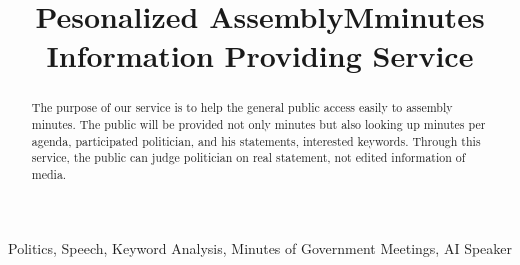 \documentclass[conference]{IEEEtran}
\begin{document}
\title{Pesonalized AssemblyMminutes Information Providing Service \\
}
\author{
\and
{}
\and
{}
\and
{}
}
\maketitle

\begin{abstract}
The purpose of our service is to help the general public access easily to assembly minutes. The public will be provided not only minutes but also looking up minutes per agenda, participated politician, and his statements, interested keywords. Through this service, the public can judge politician on real statement, not edited information of media.\linebreak \\
\end{abstract}

\begin{IEEEkeywords}
Politics, Speech, Keyword Analysis, Minutes of Government Meetings, AI Speaker  \linebreak \\
\end{IEEEkeywords}
\end{document}
